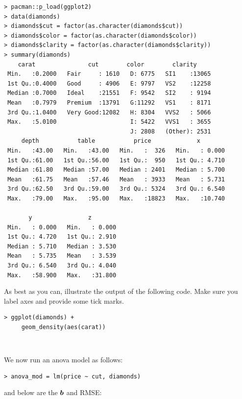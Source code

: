 \documentclass[12pt]{article}
\begin{document}
\begin{lstlisting}
> pacman::p_load(ggplot2)
> data(diamonds)
> diamonds$cut = factor(as.character(diamonds$cut))
> diamonds$color = factor(as.character(diamonds$color))
> diamonds$clarity = factor(as.character(diamonds$clarity))
> summary(diamonds)
    carat               cut        color        clarity     
 Min.   :0.2000   Fair     : 1610   D: 6775   SI1    :13065  
 1st Qu.:0.4000   Good     : 4906   E: 9797   VS2    :12258  
 Median :0.7000   Ideal    :21551   F: 9542   SI2    : 9194  
 Mean   :0.7979   Premium  :13791   G:11292   VS1    : 8171  
 3rd Qu.:1.0400   Very Good:12082   H: 8304   VVS2   : 5066  
 Max.   :5.0100                     I: 5422   VVS1   : 3655  
                                    J: 2808   (Other): 2531  
     depth           table           price             x         
 Min.   :43.00   Min.   :43.00   Min.   :  326   Min.   : 0.000  
 1st Qu.:61.00   1st Qu.:56.00   1st Qu.:  950   1st Qu.: 4.710  
 Median :61.80   Median :57.00   Median : 2401   Median : 5.700  
 Mean   :61.75   Mean   :57.46   Mean   : 3933   Mean   : 5.731  
 3rd Qu.:62.50   3rd Qu.:59.00   3rd Qu.: 5324   3rd Qu.: 6.540  
 Max.   :79.00   Max.   :95.00   Max.   :18823   Max.   :10.740  
                                                                 
       y                z         
 Min.   : 0.000   Min.   : 0.000  
 1st Qu.: 4.720   1st Qu.: 2.910  
 Median : 5.710   Median : 3.530  
 Mean   : 5.735   Mean   : 3.539  
 3rd Qu.: 6.540   3rd Qu.: 4.040  
 Max.   :58.900   Max.   :31.800 
\end{lstlisting}
\vspace{-1cm}


\benum

 As best as you can, illustrate the output of the following code. Make sure you label axes and provide some tick marks.

\begin{lstlisting}
> ggplot(diamonds) + 
     geom_density(aes(carat))
\end{lstlisting}~


 We now run an anova model as follows:

\begin{lstlisting}
> anova_mod = lm(price ~ cut, diamonds)
\end{lstlisting}
\vspace{-0.8cm}

and below are the $\boldsymbol{b}$ and RMSE:
\end{document}
